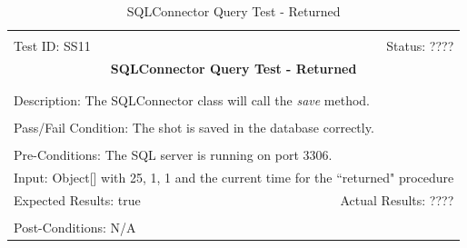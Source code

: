 \documentclass[11pt]{article}
\begin{document}
\begin{center}
\begin{table}[H]
\begin{tabular}{|l r|}\hline&\\[-2mm]
	Test ID: SS11	&Status: ????\\[-3mm]
	\multicolumn{2}{|c|}{\textbf{\large{SQLConnector Query Test - Returned}}}\\&\\\hline&\\[-3mm]
	\multicolumn{2}{|p{\textwidth}|}{Description: The SQLConnector class will call the \textit{save} method.}\\[1mm]\hline&\\[-3mm]
	\multicolumn{2}{|p{\textwidth}|}{Pass/Fail Condition: The shot is saved in the database correctly.}\\[1mm]\hline&\\[-3mm]
	\multicolumn{2}{|p{\textwidth}|}{Pre-Conditions: The SQL server is running on port 3306.}\\[4mm]
	\multicolumn{2}{|p{\textwidth}|}{Input: Object[] with 25, 1, 1 and the current time for the ``returned" procedure}\\[2mm]\hline
	\multicolumn{1}{|p{0.49\textwidth}}{Expected Results: true}	&\multicolumn{1}{|p{0.45\textwidth}|}{Actual Results: ????}\\\hline&\\[-3mm]
	\multicolumn{2}{|p{\textwidth}|}{Post-Conditions: N/A}\\\hline
\end{tabular}
\caption{SQLConnector Query Test - Returned}
\end{table}
\end{center}
\end{document}
